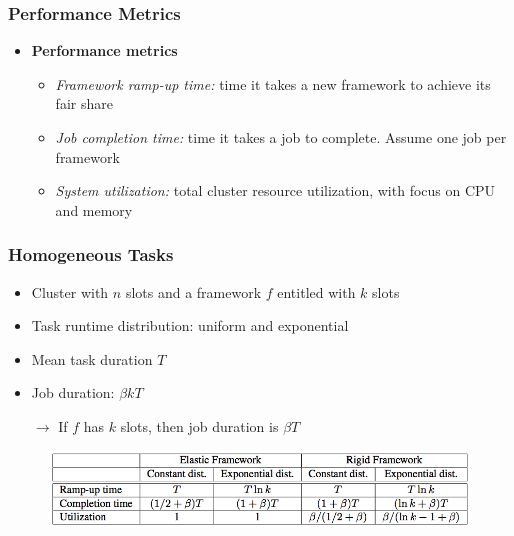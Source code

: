 \begin{frame}
\frametitle{Performance Metrics}
\begin{itemize}
	\item {\bf Performance metrics}
	\begin{itemize}
		\item {\it Framework ramp-up time:} time it takes a new framework to achieve its fair share
		\item {\it Job completion time:} time it takes a job to complete. Assume one job per framework
		\item {\it System utilization:} total cluster resource utilization, with focus on CPU and memory
	\end{itemize}
\end{itemize}
\end{frame}

\begin{frame}
\frametitle{Homogeneous Tasks}
\begin{itemize}
	\item Cluster with $n$ slots and a framework $f$ entitled with $k$ slots
	\item Task runtime distribution: uniform and exponential
	\item Mean task duration $T$
	\item Job duration: $\beta k T$
	\item[$\to$] If $f$ has $k$ slots, then job duration is $\beta T$
\end{itemize}
\begin{figure}[h]
  \centering
  \includegraphics[scale=0.4]{./figures/mesos_model}
  \label{fig:mesos_arch_example}
\end{figure}
\end{frame}

